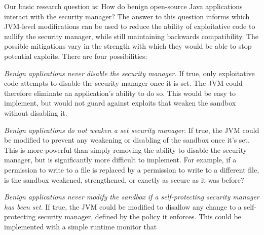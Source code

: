 \documentclass{sig-alternate}
\begin{document}
Our basic research question is: How do benign open-source Java applications interact
with the security manager? The answer to this question informs which JVM-level
modifications can be used to reduce the ability of exploitative code to
nullify the security manager, while still maintaining backwards compatibility.  The
possible mitigations vary in the strength with which they would be able to stop
potential exploits. 
There are four possibilities:
\begin{flushenum}	\setlength{\parskip}{0pt}
  \setlength{\parsep}{0pt}
  \setlength{\itemsep}{0pt}
\item \textit{Benign applications never disable the security manager.}  If true,
  only exploitative code attempts to disable the security manager once it is set.
  The JVM could therefore eliminate an application's ability to
  do so.  This would be easy to implement, but would not guard against exploits
  that weaken the sandbox without disabling it.
\item \textit{Benign applications do not weaken a set security manager}.  If
  true, the JVM could be modified to prevent any weakening or disabling of the 
  sandbox once it's set.  This is more powerful than simply removing the
  ability to disable the security manager, but is significantly more difficult to
  implement.
  For example, if a permission to write to a file is
  replaced by a permission to write to a different file, is the sandbox
  weakened, strengthened, or exactly as secure as it was before?
\item \textit{Benign applications never modify the sandbox if a self-protecting
    security manager has been set}. If true, the JVM could be modified to
  disallow any change to a self-protecting security manager, defined by the
  policy it enforces.  This could be implemented with a simple runtime monitor that

\end{flushenum}
\end{document}
